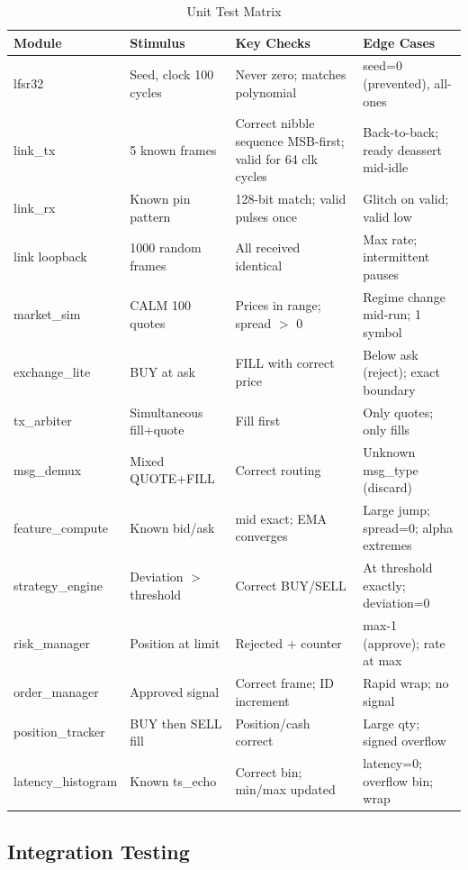 \documentclass[conference]{IEEEtran}
\begin{document}
\begin{table}[t]
\centering
\caption{Unit Test Matrix}
\label{tab:unit_tests}
\begin{tabular}{@{}lL{4cm}L{4cm}L{4cm}@{}}
\toprule
\textbf{Module} & \textbf{Stimulus} & \textbf{Key Checks} & \textbf{Edge Cases} \\
\midrule
lfsr32 & Seed, clock 100 cycles & Never zero; matches polynomial & seed=0 (prevented), all-ones \\
link\_tx & 5 known frames & Correct nibble sequence MSB-first; valid for 64 clk cycles & Back-to-back; ready deassert mid-idle \\
link\_rx & Known pin pattern & 128-bit match; valid pulses once & Glitch on valid; valid low \\
link loopback & 1000 random frames & All received identical & Max rate; intermittent pauses \\
market\_sim & CALM 100 quotes & Prices in range; spread $>$ 0 & Regime change mid-run; 1 symbol \\
exchange\_lite & BUY at ask & FILL with correct price & Below ask (reject); exact boundary \\
tx\_arbiter & Simultaneous fill+quote & Fill first & Only quotes; only fills \\
msg\_demux & Mixed QUOTE+FILL & Correct routing & Unknown msg\_type (discard) \\
feature\_compute & Known bid/ask & mid exact; EMA converges & Large jump; spread=0; alpha extremes \\
strategy\_engine & Deviation $>$ threshold & Correct BUY/SELL & At threshold exactly; deviation=0 \\
risk\_manager & Position at limit & Rejected + counter & max-1 (approve); rate at max \\
order\_manager & Approved signal & Correct frame; ID increment & Rapid wrap; no signal \\
position\_tracker & BUY then SELL fill & Position/cash correct & Large qty; signed overflow \\
latency\_histogram & Known ts\_echo & Correct bin; min/max updated & latency=0; overflow bin; wrap \\
\bottomrule
\end{tabular}
\end{table}

\subsection{Integration Testing}
\end{document}
